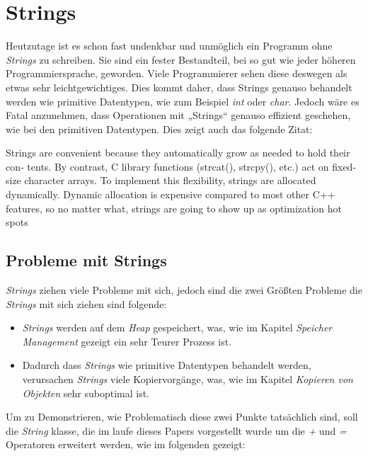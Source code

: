 \section{Strings}
Heutzutage ist es schon fast undenkbar und unmöglich ein Programm ohne \emph{Strings} zu
schreiben. Sie sind ein fester Bestandteil, bei so gut wie jeder höheren Programmiersprache,
geworden. Viele Programmierer sehen diese deswegen als etwas sehr leichtgewichtiges. Dies kommt
daher, dass Strings genauso behandelt werden wie primitive Datentypen, wie zum Beispiel \emph{int}
oder \emph{char}. Jedoch wäre es Fatal anzunehmen, dass Operationen mit „Strings“ genauso effizient
geschehen, wie bei den primitiven Datentypen. Dies zeigt auch das folgende Zitat:

\begin{zitat}
    Strings are convenient because they automatically grow as needed to hold their con‐ tents. By
    contrast, C library functions (strcat(), strcpy(), etc.) act on fixed-size character arrays.
    To implement this flexibility, strings are allocated dynamically. Dynamic allocation is
    expensive compared to most other C++ features, so no matter what, strings are going to show
    up as optimization hot spots \cite{OptimizedC++}
\end{zitat}

\subsection{Probleme mit Strings}
\emph{Strings} ziehen viele Probleme mit sich, jedoch sind die zwei Größten Probleme die
\emph{Strings} mit sich ziehen sind folgende:

\begin{itemize}
    \item \emph{Strings} werden auf dem \emph{Heap} gespeichert, was, wie im Kapitel
    \emph{Speicher Management} gezeigt ein sehr Teurer Prozess ist.
    \item Dadurch dass \emph{Strings} wie primitive Datentypen behandelt werden, verursachen
    \emph{Strings} viele Kopiervorgänge, was, wie im Kapitel \emph{Kopieren von Objekten} sehr
    suboptimal ist.
\end{itemize}

Um zu Demonstrieren, wie Problematisch diese zwei Punkte tatsächlich sind, soll die \emph{String}
klasse, die im laufe dieses Papers vorgestellt wurde um die \emph{+} und \emph{=} Operatoren
erweitert werden, wie im folgenden gezeigt:

